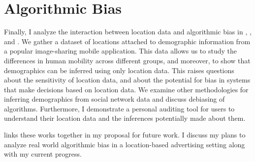 \section{Algorithmic Bias}
Finally, I analyze the interaction between location data and algorithmic bias in , , and .
We gather a dataset of locations attached to demographic information from a popular image-sharing mobile application.
This data allows us to study the differences in human mobility across different groups, and moreover, to show that demographics can be inferred using only location data.
This raises questions about the sensitivity of location data, and about the potential for bias in systems that make decisions based on location data.
We examine other methodologies for inferring demographics from social network data and discuss debiasing of algorithms.
Furthermore, I demonstrate a personal auditing tool for users to understand their location data and the inferences potentially made about them.

 links these works together in my proposal for future work.
I discuss my plans to analyze real world algorithmic bias in a location-based advertising setting along with my current progress.



